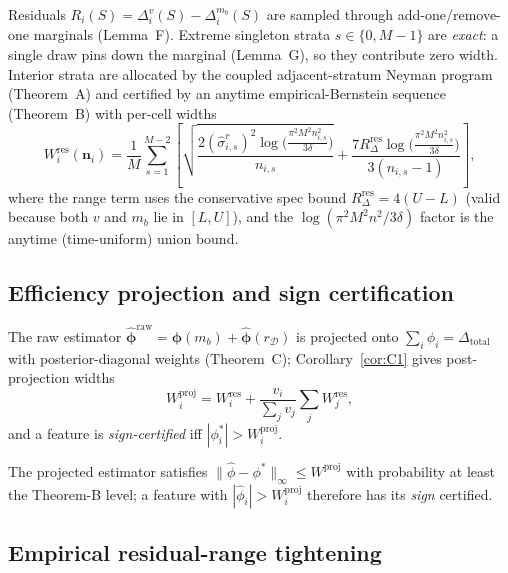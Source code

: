 \documentclass[preprint,12pt]{elsarticle}
\begin{document}
Residuals $R_i(S)=\Delta_i^v(S)-\Delta_i^{m_b}(S)$ are sampled through add-one/remove-one marginals (Lemma~F). Extreme singleton strata $s\in\{0,M-1\}$ are \emph{exact}: a single draw pins down the marginal (Lemma~G), so they contribute zero width. Interior strata are allocated by the coupled adjacent-stratum Neyman program (Theorem~A) and certified by an anytime empirical-Bernstein sequence (Theorem~B) with per-cell widths
\begin{equation}
W_i^{\mathrm{res}}(\mathbf{n}_i)=\frac1M\sum_{s=1}^{M-2}
\left[\sqrt{\frac{2(\hat\sigma_{i,s}^r)^2\log\!\big(\frac{\pi^2 M^2 n_{i,s}^2}{3\delta}\big)}{n_{i,s}}}
+\frac{7 R_\Delta^{\mathrm{res}}\log\!\big(\frac{\pi^2 M^2 n_{i,s}^2}{3\delta}\big)}{3(n_{i,s}-1)}\right],
\label{eq:Wres}
\end{equation}
where the range term uses the conservative spec bound $R_\Delta^{\mathrm{res}}=4(U-L)$ (valid because both $v$ and $m_b$ lie in $[L,U]$), and the $\log(\pi^2 M^2 n^2/3\delta)$ factor is the anytime (time-uniform) union bound.

\subsection{Efficiency projection and sign certification}\label{sec:proj}

The raw estimator $\hat{\boldsymbol{\phi}}^{\mathrm{raw}}=\boldsymbol{\phi}(m_b)+\hat{\boldsymbol{\phi}}(r_{\mathcal{D}})$ is projected onto $\sum_i\phi_i=\Delta_{\mathrm{total}}$ with posterior-diagonal weights (Theorem~C); Corollary~\ref{cor:C1} gives post-projection widths
\begin{equation}
W_i^{\mathrm{proj}}=W_i^{\mathrm{res}}+\frac{v_i}{\sum_j v_j}\sum_j W_j^{\mathrm{res}},
\label{eq:proj}
\end{equation}
and a feature is \emph{sign-certified} iff $|\phi_i^*|>W_i^{\mathrm{proj}}$.

\begin{corollary}\label{cor:C1}
The projected estimator satisfies $\|\hat\phi-\phi^*\|_\infty\le W^{\mathrm{proj}}$ with probability at least the Theorem-B level; a feature with $|\hat\phi_i|>W_i^{\mathrm{proj}}$ therefore has its \emph{sign} certified.
\end{corollary}

\subsection{Empirical residual-range tightening}\label{sec:tight}
\end{document}
